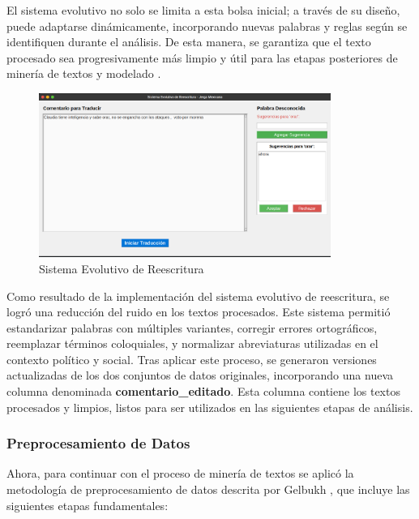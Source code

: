 \documentclass[10pt, a4paper]{article}
\begin{document}
	El sistema evolutivo no solo se limita a esta bolsa inicial; a través de su diseño, puede adaptarse dinámicamente, incorporando nuevas palabras y reglas según se identifiquen durante el análisis. De esta manera, se garantiza que el texto procesado sea progresivamente más limpio y útil para las etapas posteriores de minería de textos y modelado \parencite{galindo1991sistemas}.
	
	\begin{figure}[h!] %
		\centering
		\includegraphics[width=0.85\textwidth]{evolutivo.png} %
		\caption{Sistema Evolutivo de Reescritura} %
		\label{fig:evolutivo} %
	\end{figure}
	
	Como resultado de la implementación del sistema evolutivo de reescritura, se logró una reducción del ruido en los textos procesados. Este sistema permitió estandarizar palabras con múltiples variantes, corregir errores ortográficos, reemplazar términos coloquiales, y normalizar abreviaturas utilizadas en el contexto político y social. Tras aplicar este proceso, se generaron versiones actualizadas de los dos conjuntos de datos originales, incorporando una nueva columna denominada \textbf{comentario\_editado}. Esta columna contiene los textos procesados y limpios, listos para ser utilizados en las siguientes etapas de análisis.
	
	\subsubsection{Preprocesamiento de Datos}
	
	Ahora, para continuar con el proceso de minería de textos se aplicó la metodología de preprocesamiento de datos descrita por Gelbukh \parencite{gelbukh2003procesamiento}, que incluye las siguientes etapas fundamentales:
	
\end{document}
